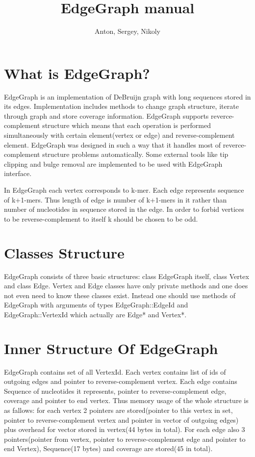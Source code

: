\documentclass[a4paper,10pt]{article}
\title{EdgeGraph manual}
\author{Anton, Sergey, Nikoly}
\begin{document}
\maketitle

\section*{What is EdgeGraph?}
EdgeGraph is an implementation of DeBruijn graph with long sequences stored in its edges.
Implementation includes methods to change graph structure, iterate through graph and store coverage information.
EdgeGraph supports reverce-complement structure which means that each operation is performed simultaneously with 
certain element(vertex or edge) and reverse-complement element.
EdgeGraph was designed in such a way that it handles most of reverce-complement structure problems automatically.
Some external tools like tip clipping and bulge removal are implemented to be used with EdgeGraph interface.

In EdgeGraph each vertex corresponds to k-mer.
Each edge represents sequence of k+1-mers.
Thus length of edge is number of k+1-mers in it rather than number of nucleotides in sequence stored in the edge.
In order to forbid vertices to be reverse-complement to itself k should be chosen to be odd.

\section*{Classes Structure}
EdgeGraph consists of three basic structures: class EdgeGraph itself, class Vertex and class Edge.
Vertex and Edge classes have only private methods and one does not even need to know these classes exist.
Instead one should use methods of EdgeGraph with arguments of types EdgeGraph::EdgeId and EdgeGraph::VertexId which actually are
Edge* and Vertex*.

\section*{Inner Structure Of EdgeGraph}
EdgeGraph contains set of all VertexId.
Each vertex contains list of ids of outgoing edges and pointer to reverse-complement vertex.
Each edge contains Sequence of nucleotides it represents, pointer to reverse-complement edge, coverage and pointer to end vertex.
Thus memory usage of the whole structure is as fallows: for each vertex 2 pointers are stored(pointer to this vertex in set, pointer
to reverse-complement vertex and pointer in vector of outgoing edges) plus overhead for vector stored in vertex(44 bytes in total).
For each edge also 3 pointers(pointer from vertex, pointer to reverse-complement edge and pointer to end Vertex),
Sequence(17 bytes) and coverage are stored(45 in total). 
\end{document}

